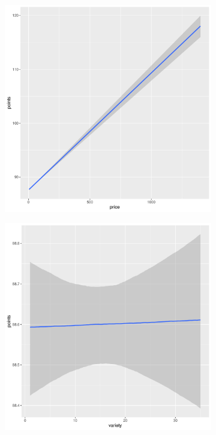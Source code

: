 \documentclass{article}
\begin{document}
\begin{figure}[htbp]
	\centering
	\begin{subfigure}{0.22\textwidth}
		\includegraphics[width=\textwidth]{imgs/Rplots-11.pdf}
	\end{subfigure}\hfill
	\begin{subfigure}{0.22\textwidth}
		\includegraphics[width=\textwidth]{imgs/Rplots-12.pdf}

\end{subfigure}
\end{figure}
\end{document}
